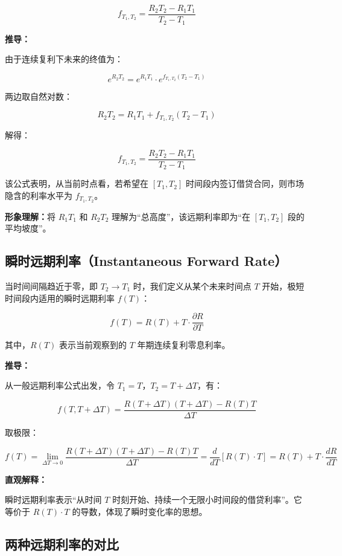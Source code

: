 \begin{equation}
f_{T_1,T_2} = \frac{R_2 T_2 - R_1 T_1}{T_2 - T_1}
\end{equation}

\textbf{推导：}

由于连续复利下未来的终值为：

\[
e^{R_2 T_2} = e^{R_1 T_1} \cdot e^{f_{T_1,T_2} (T_2 - T_1)}
\]

两边取自然对数：

\[
R_2 T_2 = R_1 T_1 + f_{T_1,T_2}(T_2 - T_1)
\]

解得：

\[
f_{T_1,T_2} = \frac{R_2 T_2 - R_1 T_1}{T_2 - T_1}
\]

该公式表明，从当前时点看，若希望在 $[T_1, T_2]$ 时间段内签订借贷合同，则市场隐含的利率水平为 $f_{T_1,T_2}$。

\vspace{0.5em}
\textbf{形象理解：}将 $R_1 T_1$ 和 $R_2 T_2$ 理解为“总高度”，该远期利率即为“在 $[T_1, T_2]$ 段的平均坡度”。

\subsection{瞬时远期利率（Instantaneous Forward Rate）}

当时间间隔趋近于零，即 $T_2 \rightarrow T_1$ 时，我们定义从某个未来时间点 $T$ 开始，极短时间段内适用的瞬时远期利率 $f(T)$：

\begin{equation}
f(T) = R(T) + T \cdot \frac{\partial R}{\partial T}
\end{equation}

其中，$R(T)$ 表示当前观察到的 $T$ 年期连续复利零息利率。

\textbf{推导：}

从一般远期利率公式出发，令 $T_1 = T$，$T_2 = T + \Delta T$，有：

\[
f(T, T+\Delta T) = \frac{R(T+\Delta T)(T + \Delta T) - R(T)T}{\Delta T}
\]

取极限：

\[
f(T) = \lim_{\Delta T \to 0} \frac{R(T+\Delta T)(T + \Delta T) - R(T)T}{\Delta T}
= \frac{d}{dT} [R(T) \cdot T]
= R(T) + T \cdot \frac{dR}{dT}
\]

\textbf{直观解释：}

瞬时远期利率表示“从时间 $T$ 时刻开始、持续一个无限小时间段的借贷利率”。它等价于 $R(T) \cdot T$ 的导数，体现了瞬时变化率的思想。

\subsection{两种远期利率的对比}

